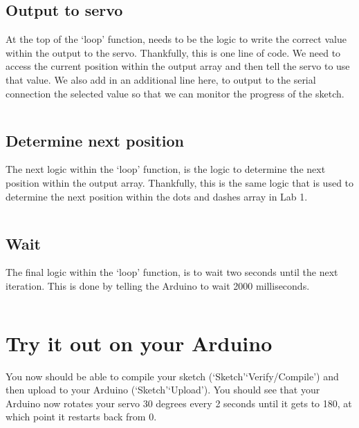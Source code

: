 \documentclass[11pt,a4paper]{article}
\begin{document}
\subsection{Output to servo}
At the top of the `loop' function, needs to be the logic to write the correct value within the output to the servo. Thankfully, this is one line of code. We need to access the current position within the output array and then tell the servo to use that value. We also add in an additional line here, to output to the serial connection the selected value so that we can monitor the progress of the sketch.\\ 

\vspace{-1.75em}
\inputminted{arduino}{./src/6-loop-write.txt}
\vspace{-.5em}

\subsection{Determine next position}
The next logic within the `loop' function, is the logic to determine the next position within the output array. Thankfully, this is the same logic that is used to determine the next position within the dots and dashes array in Lab 1.\\

\vspace{-1.75em}
\inputminted{arduino}{./src/7-loop-next.txt}
\vspace{-.5em}

\subsection{Wait}
The final logic within the `loop' function, is to wait two seconds until the next iteration. This is done by telling the Arduino to wait 2000 milliseconds.\\

\vspace{-1.75em}
\inputminted{arduino}{./src/8-loop-sleep.txt}
\vspace{-2em}

\section*{Try it out on your Arduino}
You now should be able to compile your sketch (`Sketch'\textrightarrow `Verify/Compile') and then upload to your Arduino (`Sketch'\textrightarrow `Upload'). You should see that your Arduino now rotates your servo 30 degrees every 2 seconds until it gets to 180, at which point it restarts back from 0.\\
\end{document}
